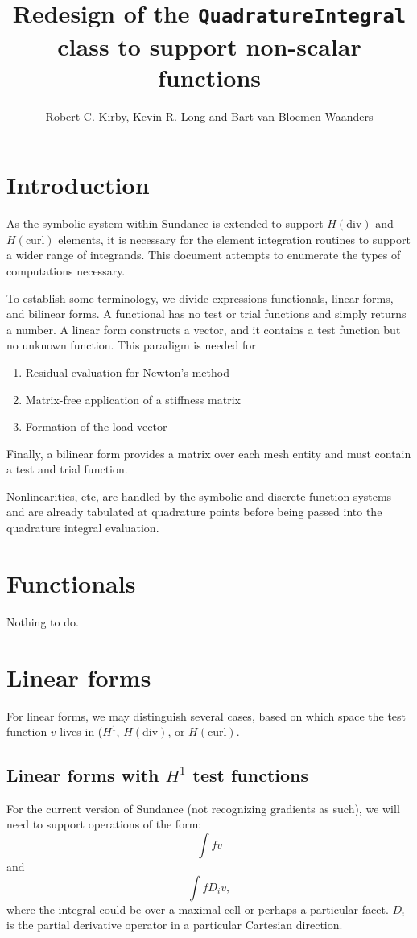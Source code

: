\documentclass{article}
\author{Robert C. Kirby, Kevin R. Long and Bart van Bloemen Waanders}
\title{Redesign of the \texttt{QuadratureIntegral} class to support non-scalar functions}
\begin{document}
\maketitle

\section{Introduction}
As the symbolic system within Sundance is extended to support 
\( H(\mathrm{div}) \) and \( H(\mathrm{curl}) \) elements, it is
necessary for the element integration routines to support a wider
range of integrands.  This document attempts to enumerate the types
of computations necessary.

To establish some terminology, we divide expressions functionals,
linear forms, and bilinear forms.  A functional has
no test or trial functions and simply returns a number.  A linear form
constructs a vector, and it contains a test function but no unknown function.
This paradigm is needed for 
\begin{enumerate}
\item Residual evaluation for Newton's method
\item Matrix-free application of a stiffness matrix
\item Formation of the load vector
\end{enumerate}
Finally, a bilinear form provides a matrix over each mesh entity and must
contain a test and trial function.

Nonlinearities, etc, are handled by the symbolic and discrete function
systems and are already tabulated at quadrature points before being
passed into the quadrature integral evaluation.

\section{Functionals}
Nothing to do.

\section{Linear forms}
For linear forms, we may distinguish several cases, based on which space
the test function \( v \) lives in (\(H^1\), \( H(\mathrm{div}) \), or
\( H(\mathrm{curl}) \).
\subsection{Linear forms with \( H^1 \) test functions}
For the current version of Sundance (not recognizing gradients as
such), we will need to support operations of the form:
\[
\int f v
\]
and
\[
\int f D_i v,
\]
where the integral could be over a maximal cell or perhaps a
particular facet.  \( D_i \) is the partial derivative operator in
a particular Cartesian direction.
\end{document}
